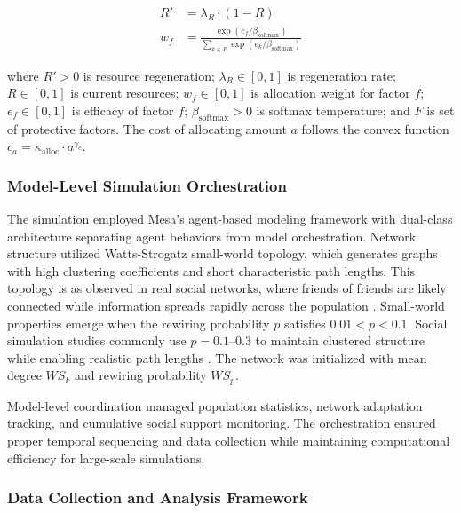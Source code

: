 \documentclass[
  letterpaper,
  DIV=11,
  numbers=noendperiod]{scrartcl}
\begin{document}
\begin{align}
R' &= \lambda_R \cdot (1 - R) \\
w_f &= \frac{\exp(e_f / \beta_{\text{softmax}})}{\sum_{k \in F} \exp(e_k / \beta_{\text{softmax}})}
\label{eq-resource-dynamics}
\end{align}

where \(R' > 0\) is resource regeneration; \(\lambda_R \in [0,1]\) is
regeneration rate; \(R \in [0,1]\) is current resources;
\(w_f \in [0,1]\) is allocation weight for factor \(f\);
\(e_f \in [0,1]\) is efficacy of factor \(f\);
\(\beta_{\text{softmax}} > 0\) is softmax temperature; and \(F\) is set
of protective factors. The cost of allocating amount \(a\) follows the
convex function \(c_a = \kappa_{\mathrm{alloc}} \cdot a^{\gamma_c}\).

\subsubsection{Model-Level Simulation
Orchestration}\label{model-level-simulation-orchestration}

The simulation employed Mesa's agent-based modeling framework with
dual-class architecture separating agent behaviors from model
orchestration. Network structure utilized Watts-Strogatz small-world
topology, which generates graphs with high clustering coefficients and
short characteristic path lengths. This topology is as observed in real
social networks, where friends of friends are likely connected while
information spreads rapidly across the population \citep{watts1998}.
Small-world properties emerge when the rewiring probability \(p\)
satisfies \(0.01 < p < 0.1\). Social simulation studies commonly use
\(p = 0.1\)--\(0.3\) to maintain clustered structure while enabling
realistic path lengths \citep{watts1998}. The network was initialized
with mean degree \(WS_k\) and rewiring probability \(WS_p\).

Model-level coordination managed population statistics, network
adaptation tracking, and cumulative social support monitoring. The
orchestration ensured proper temporal sequencing and data collection
while maintaining computational efficiency for large-scale simulations.

\subsubsection{Data Collection and Analysis
Framework}\label{data-collection-and-analysis-framework}
\end{document}
